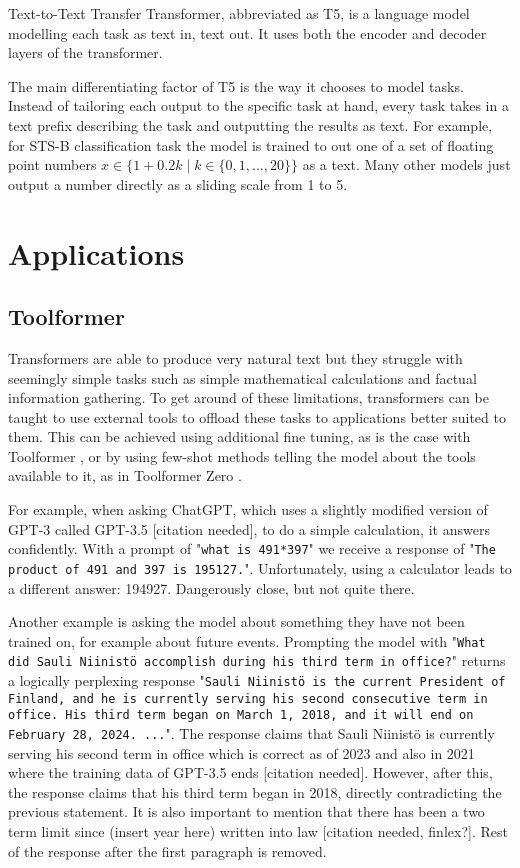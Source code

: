 \documentclass[twoside]{article}
\begin{document}
Text-to-Text Transfer Transformer, abbreviated as T5, is a language model modelling each
task as text in, text out. It uses both the encoder and decoder layers of the transformer.
\cite{raffel_exploring_2020}

The main differentiating factor of T5 is the way it chooses to model tasks. Instead of 
tailoring each output to the specific task at hand, every task takes in a text prefix
describing the task and outputting the results as text. For example, for STS-B classification
task the model is trained to out one of a set of floating point numbers 
$x \in \{ 1+0.2k \mid k \in \{ 0, 1, ..., 20\} \}$ as a text. Many other models just 
output a number directly as a sliding scale from 1 to 5. 

\section{Applications}

\subsection{Toolformer}
Transformers are able to produce very natural text but they struggle with seemingly
simple tasks such as simple mathematical calculations and factual information gathering.
To get around of these limitations, transformers can be taught to use external tools
to offload these tasks to applications better suited to them. \cite{schick_toolformer_2023} 
This can be achieved using additional fine tuning, as is the case with Toolformer
\cite{schick_toolformer_2023}, or by using few-shot methods telling the model 
about the tools available to it, as in Toolformer Zero \cite{markus_toolformer_2023}.

For example, when asking ChatGPT, which uses a slightly modified version of GPT-3 called 
GPT-3.5 [citation needed], to do a simple calculation, it answers confidently. 
With a prompt of "\texttt{what is 491*397}" we receive a response of 
"\texttt{The product of 491 and 397 is 195127.}". Unfortunately, using a calculator
leads to a different answer: 194927. Dangerously close, but not quite there.

Another example is asking the model about something they have not been trained on, for
example about future events. Prompting the model with 
"\texttt{What did Sauli Niinistö accomplish during his third term in office?}" returns
a logically perplexing response "\texttt{Sauli Niinistö is the current President of Finland, 
and he is currently serving his second consecutive term in office. 
His third term began on March 1, 2018, and it will end on February 28, 2024. ...}".
The response claims that Sauli Niinistö is currently serving his second term in office
which is correct as of 2023 and also in 2021 where the training data of GPT-3.5 ends 
[citation needed]. However, after this, the response claims that his third term began
in 2018, directly contradicting the previous statement. It is also important to mention
that there has been a two term limit since (insert year here) written into law 
[citation needed, finlex?]. Rest of the response after the first paragraph is removed.
\end{document}
